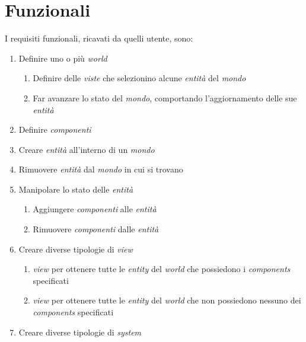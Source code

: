 \section{Funzionali}\label{sec:funzionali}
I requisiti funzionali, ricavati da quelli utente, sono:
\begin{enumerate}[label=\textbf{\ref{sec:funzionali}.\arabic*}]
    \item \label{itm:f1} Definire uno o più \textit{world}
    \begin{enumerate}[label=\textbf{\ref{itm:f1}.\arabic*}]
        \item \label{itm:ff1} Definire delle \textit{viste} che selezionino alcune \textit{entità} del \textit{mondo}
        \item \label{itm:ff2} Far avanzare lo stato del \textit{mondo}, comportando l'aggiornamento delle sue \textit{entità}
    \end{enumerate}
    \item \label{itm:f2} Definire \textit{componenti}
    \item \label{itm:f3} Creare \textit{entità} all'interno di un \textit{mondo}
    \item \label{itm:f4} Rimuovere \textit{entità} dal \textit{mondo} in cui si trovano
    \item \label{itm:f5} Manipolare lo stato delle \textit{entità}
    \begin{enumerate}[label=\textbf{\ref{itm:f5}.\arabic*}]
        \item \label{itm:ff3} Aggiungere \textit{componenti} alle \textit{entità}
        \item \label{itm:ff4} Rimuovere \textit{componenti} dalle \textit{entità}
    \end{enumerate}
    \item \label{itm:f6} Creare diverse tipologie di \textit{view}
    \begin{enumerate}[label=\textbf{\ref{itm:f6}.\arabic*}]
        \item \label{itm:ff5} \textit{view} per ottenere tutte le \textit{entity} del \textit{world} che possiedono i \textit{components} specificati
        \item \label{itm:ff6} \textit{view} per ottenere tutte le \textit{entity} del \textit{world} che non possiedono nessuno dei \textit{components} specificati
    \end{enumerate}
    \item \label{itm:f7} Creare diverse tipologie di \textit{system} %

\end{enumerate}
